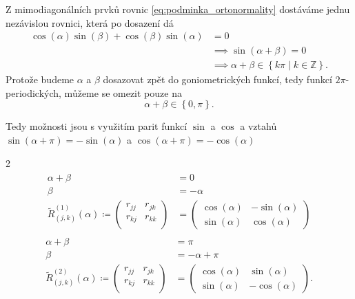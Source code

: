 \documentclass[czech]{article}
\newcommand\Z{\ensuremath{\mathbb{Z}}}
\renewcommand\tilde\widetilde
\begin{document}
Z mimodiagonálních prvků rovnic \ref{eq:podminka_ortonormality} dostáváme jednu nezávislou rovnici, která po dosazení dá
\begin{align*}
	\cos(\alpha)\sin(\beta) +\cos(\beta)\sin(\alpha) & = 0                                                               \\
	                                                 & \implies \sin(\alpha + \beta) = 0                                 \\
	                                                 & \implies \alpha + \beta \in \left\{ k \pi \mid k \in \Z \right\}.
\end{align*}
Protože budeme $\alpha$ a $\beta$ dosazovat zpět do goniometrických funkcí, tedy funkcí $2\pi$-periodických, můžeme se omezit pouze na
\[
	\alpha + \beta \in \left\{ 0,\pi \right\} .
\]

Tedy možnosti jsou s využitím parit funkcí $\sin$ a $\cos$ a vztahů $\sin(\alpha + \pi) = -\sin(\alpha)$ a $\cos(\alpha + \pi) = -\cos(\alpha)$
\nopagebreak
\begin{multicols}{2}
	\begin{align}
		\begin{split}
			\label{def:tvar rotace 1}
			\alpha + \beta            & = 0       \\
			\beta                     & = -\alpha \\
			\tilde{R}_{(j,k)}^{(1)}(\alpha) \coloneqq
			\begin{pmatrix}
				r_{jj} & r_{jk} \\
				r_{kj} & r_{kk} \\
			\end{pmatrix} & =
			\begin{pmatrix}
				\cos(\alpha) & -\sin(\alpha) \\
				\sin(\alpha) & \cos(\alpha)
			\end{pmatrix}
		\end{split}
	\end{align}\vfill\null\columnbreak
	\begin{align}
		\begin{split}
			\label{def:tvar rotace 2}
			\alpha + \beta & = \pi \\
			\beta &= -\alpha + \pi \\
			\tilde{R}_{(j,k)}^{(2)}(\alpha) \coloneqq
			\begin{pmatrix}
				r_{jj} & r_{jk} \\
				r_{kj} & r_{kk} \\
			\end{pmatrix} & =
			\begin{pmatrix}
				\cos(\alpha) & \sin(\alpha)  \\
				\sin(\alpha) & -\cos(\alpha)
			\end{pmatrix}
			.\end{split}
	\end{align}\vfill\null
\end{multicols}
\end{document}
